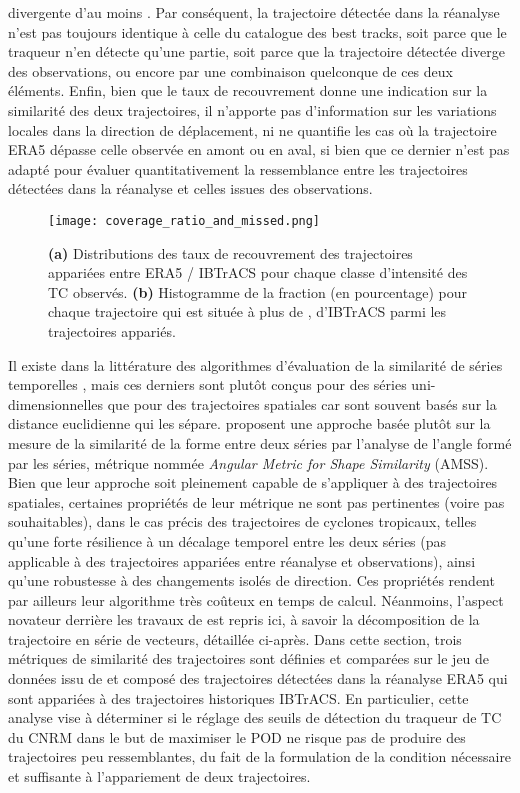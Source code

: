 \documentclass[../main.tex]{subfiles}
\begin{document}
divergente d'au moins . Par conséquent, la trajectoire détectée dans la réanalyse n'est pas toujours identique à celle du catalogue des best tracks,
soit parce que le traqueur n'en détecte qu'une partie, soit parce que la trajectoire détectée diverge des observations, ou encore par une combinaison quelconque
de ces deux éléments. Enfin, bien que le taux de recouvrement donne une indication sur la similarité des deux trajectoires, il n'apporte pas d'information sur
les variations locales dans la direction de déplacement, ni ne quantifie les cas où la trajectoire ERA5 dépasse celle observée en amont ou en aval, si bien que
ce dernier n'est pas adapté pour évaluer quantitativement la ressemblance entre les trajectoires détectées dans la réanalyse et celles issues des observations.

\begin{figure}[tb]
    \centering
    \texttt{[image: coverage\_ratio\_and\_missed.png]}
    \caption{\textbf{(a)} Distributions des taux de recouvrement des trajectoires appariées entre ERA5 / IBTrACS pour chaque classe d'intensité des TC observés.
    \textbf{(b)} Histogramme de la fraction (en pourcentage) pour chaque trajectoire qui est située à plus de , d'IBTrACS parmi les trajectoires appariés.}
    \label{fig:coverage_ratio}
\end{figure}

Il existe dans la littérature des algorithmes d'évaluation de la similarité de séries temporelles
\parencite{faloutsos_fast_1994,das_finding_1997,frentzos_indexbased_2007}, mais ces derniers sont plutôt conçus pour des séries uni-dimensionnelles que pour des
trajectoires spatiales car sont souvent basés sur la distance euclidienne qui les sépare. \textcite{nakamura_shapebased_2013} proposent une approche basée plutôt
sur la mesure de la similarité de la forme entre deux séries par l'analyse de l'angle formé par les séries, métrique nommée \textit{Angular Metric for Shape
Similarity} (AMSS). Bien que leur approche soit pleinement capable de s'appliquer à des trajectoires spatiales, certaines propriétés de leur métrique ne sont
pas pertinentes (voire pas souhaitables), dans le cas précis des trajectoires de cyclones tropicaux, telles qu'une forte résilience à un décalage temporel entre
les deux séries (pas applicable à des trajectoires appariées entre réanalyse et observations), ainsi qu'une robustesse à des changements isolés de direction.
Ces propriétés rendent par ailleurs leur algorithme très coûteux en temps de calcul. Néanmoins, l'aspect novateur derrière les travaux de
\textcite{nakamura_shapebased_2013} est repris ici, à savoir la décomposition de la trajectoire en série de vecteurs, détaillée ci-après. Dans cette section, trois
métriques de similarité des trajectoires sont définies et comparées sur le jeu de données issu de \textcite{dulac_assessing_2023} et composé des trajectoires
détectées dans la réanalyse ERA5 qui sont appariées à des trajectoires historiques IBTrACS. En particulier, cette analyse vise à déterminer si le réglage des
seuils de détection du traqueur de TC du CNRM dans le but de maximiser le POD ne risque pas de produire des trajectoires peu ressemblantes, du fait de la
formulation de la condition nécessaire et suffisante à l'appariement de deux trajectoires.
\end{document}
